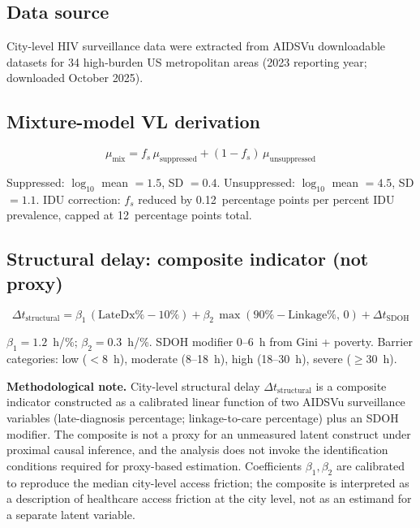 \documentclass[11pt]{article}
\theoremstyle{definition}
\theoremstyle{remark}
\begin{document}
\subsection{Data source}

City-level HIV surveillance data were extracted from AIDSVu downloadable datasets for 34 high-burden US metropolitan areas (2023 reporting year; downloaded October 2025).

\subsection{Mixture-model VL derivation}

\begin{equation}
\mu_{\text{mix}} = f_{s}\,\mu_{\text{suppressed}} + (1 - f_{s})\,\mu_{\text{unsuppressed}}
\label{eq:mixture}
\end{equation}

Suppressed: $\log_{10}$ mean $= 1.5$, SD $= 0.4$. Unsuppressed: $\log_{10}$ mean $= 4.5$, SD $= 1.1$. IDU correction: $f_{s}$ reduced by 0.12~percentage points per percent IDU prevalence, capped at 12~percentage points total.

\subsection{Structural delay: composite indicator (not proxy)}

\begin{equation}
\Delta t_{\text{structural}} = \beta_{1}\,(\text{LateDx}\% - 10\%) + \beta_{2}\,\max(90\% - \text{Linkage}\%,\,0) + \Delta t_{\text{SDOH}}
\label{eq:delay_si}
\end{equation}

$\beta_{1} = 1.2$~h/\%; $\beta_{2} = 0.3$~h/\%. SDOH modifier 0--6~h from Gini + poverty. Barrier categories: low ($<$8~h), moderate (8--18~h), high (18--30~h), severe ($\geq$30~h).

\textbf{Methodological note.} City-level structural delay $\Delta t_{\text{structural}}$ is a composite indicator constructed as a calibrated linear function of two AIDSVu surveillance variables (late-diagnosis percentage; linkage-to-care percentage) plus an SDOH modifier. The composite is not a proxy for an unmeasured latent construct under proximal causal inference\cite{tchetgentchetgen2020_si}, and the analysis does not invoke the identification conditions required for proxy-based estimation\cite{pearl2009_si}. Coefficients $\beta_{1}, \beta_{2}$ are calibrated to reproduce the median city-level access friction; the composite is interpreted as a description of healthcare access friction at the city level, not as an estimand for a separate latent variable.
\end{document}
